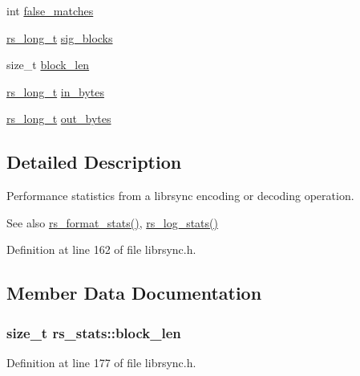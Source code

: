 \begin{DoxyCompactItemize}
int \hyperlink{structrs__stats_a6c77fd7f630fcd027c80a73cfb8a1d8c}{false\+\_\+matches}
\item 
\hyperlink{librsync-config_8h_a6edddd44ca74c10ea65ef82d116e0ffa}{rs\+\_\+long\+\_\+t} \hyperlink{structrs__stats_acacc5f67f9babdefed46bf12473c985f}{sig\+\_\+blocks}
\item 
size\+\_\+t \hyperlink{structrs__stats_ac55f8f367cb710aeb7bb890460b7b91c}{block\+\_\+len}
\item 
\hyperlink{librsync-config_8h_a6edddd44ca74c10ea65ef82d116e0ffa}{rs\+\_\+long\+\_\+t} \hyperlink{structrs__stats_afc6c46001cdce8922e443946c4151051}{in\+\_\+bytes}
\item 
\hyperlink{librsync-config_8h_a6edddd44ca74c10ea65ef82d116e0ffa}{rs\+\_\+long\+\_\+t} \hyperlink{structrs__stats_ace1905d4a0a8d1dfd76a94051afbe571}{out\+\_\+bytes}
\end{DoxyCompactItemize}


\subsection{Detailed Description}
Performance statistics from a librsync encoding or decoding operation. 

\begin{DoxySeeAlso}{See also}
\hyperlink{librsync_8h_acca80c2890032283d93dc7abf02aec6f}{rs\+\_\+format\+\_\+stats()}, \hyperlink{librsync_8h_a11879526851c210cb64d3e9d9ca5b02d}{rs\+\_\+log\+\_\+stats()} 
\end{DoxySeeAlso}


Definition at line 162 of file librsync.\+h.



\subsection{Member Data Documentation}
\hypertarget{structrs__stats_ac55f8f367cb710aeb7bb890460b7b91c}{}
\subsubsection[{block\+\_\+len}]{\setlength{\rightskip}{0pt plus 5cm}size\+\_\+t rs\+\_\+stats\+::block\+\_\+len}\label{structrs__stats_ac55f8f367cb710aeb7bb890460b7b91c}


Definition at line 177 of file librsync.\+h.

